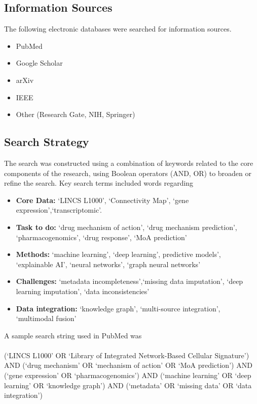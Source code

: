 \documentclass[twocolumn]{article}
\begin{document}
\subsection{Information Sources}
The following electronic databases were searched for information sources.
\begin{itemize}
    \item PubMed
    \item Google Scholar
    \item arXiv
    \item IEEE
    \item Other (Research Gate, NIH, Springer)
\end{itemize}

\subsection{Search Strategy}
The search was constructed using a combination of keywords related to the core components of the research, using Boolean operators (AND, OR) to broaden or refine the search. Key search terms included words regarding
\\
\begin{itemize}
    \item \textbf{Core Data:} `LINCS L1000', `Connectivity Map', `gene expression',`transcriptomic'.
    \item  \textbf{Task to do:} `drug mechanism of action', `drug mechanism prediction', `pharmacogenomics', `drug response', `MoA prediction'
    \item  \textbf{Methods:} `machine learning', `deep learning', predictive models', `explainable AI', `neural networks', `graph neural networks'
    \item  \textbf{Challenges:} `metadata incompleteness',`missing data imputation', `deep learning imputation', `data inconsistencies'
    \item  \textbf{Data integration:} `knowledge graph', `multi-source integration', `multimodal fusion'
\end{itemize}
A sample search string used in PubMed was\\
\\
(`LINCS L1000' OR `Library of Integrated Network-Based Cellular Signature') AND 
(`drug mechanism' OR `mechanism of action' OR `MoA prediction') AND 
(`gene expression' OR `pharmacogenomics') AND 
(`machine learning' OR `deep learning' OR `knowledge graph') AND 
(`metadata' OR `missing data' OR `data integration')
\\
\end{document}
